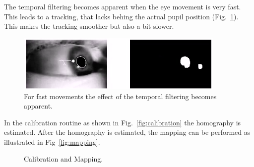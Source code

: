 The temporal filtering becomes apparent when the eye movement is very fast. This leads to a tracking, that lacks behing the actual pupil position (Fig.~\ref{fig:pupiltemporal}). This makes the tracking smoother but also a bit slower.

\begin{figure}[h]
  \centering
  \includegraphics[width=0.9\textwidth]{fin_temporal.png}
  \caption{For fast movements the effect of the temporal filtering becomes apparent.}\label{fig:pupiltemporal}
\end{figure}

In the calibration routine as shown in Fig.~\ref{fig:calibration} the homography is estimated.
After the homography is estimated, the mapping can be performed as illustrated in Fig~\ref{fig:mapping}.

\begin{figure}[h]
  \centering
  \caption{Calibration and Mapping.}\label{fig:calibrationandmapping}
\end{figure}


